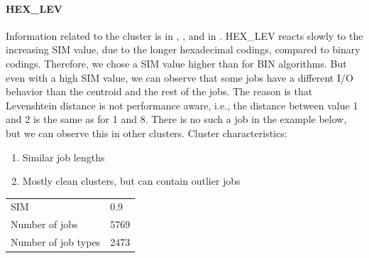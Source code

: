 \documentclass[]{llncs}
\begin{document}
\paragraph{HEX\_LEV}
Information related to the cluster is in , , and in .
HEX\_LEV reacts slowly to the increasing SIM value, due to the longer hexadecimal codings, compared to binary codings.
Therefore, we chose a SIM value higher than for BIN algorithms.
But even with a high SIM value, we can observe that some jobs have a different I/O behavior than the centroid and the rest of the jobs.
The reason is that Levenshtein distance is not performance aware, i.e., the distance between value 1 and 2 is the same as for 1 and 8.
There is no such a job in the example below, but we can observe this in other clusters.
Cluster characteristics:
\begin{enumerate}
 \item Similar job lengths
 \item Mostly clean clusters, but can contain outlier jobs
\end{enumerate}
\begingroup
	\centering
	\begin{tabular}{ll}
		SIM & 0.9 \\
		Number of jobs & 5769 \\
		Number of job types & 2473 \\
	\end{tabular}
	\label{tab:hex_lev:stats}
\endgroup
\begingroup
  \centering
\end{document}
